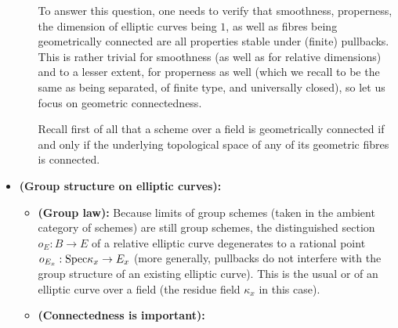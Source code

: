 \begin{remark}
\begin{itemize}
\begin{enumerate}
                                To answer this question, one needs to verify that smoothness, properness, the dimension of elliptic curves being $1$, as well as fibres being geometrically connected are all properties stable under (finite) pullbacks. This is rather trivial for smoothness (as well as for relative dimensions) and to a lesser extent, for properness as well (which we recall to be the same as being separated, of finite type, and universally closed), so let us focus on geometric connectedness.
                                
                                Recall first of all that a scheme over a field is geometrically connected if and only if the underlying topological space of any of its geometric fibres is connected.
                            \end{enumerate}
                        \item \textbf{(Group structure on elliptic curves):} 
                            \begin{itemize}
                                \item \textbf{(Group law):} Because limits of group schemes (taken in the ambient category of schemes) are still group schemes, the distinguished section $o_E: B \to E$ of a relative elliptic curve degenerates to a rational point $o_{E_x}: \mathrm{Spec} \kappa_x \to E_x$ (more generally, pullbacks do not interfere with the group structure of an existing elliptic curve). This is the usual  or  of an elliptic curve over a field (the residue field $\kappa_x$ in this case).
                                \item \textbf{(Connectedness is important):}
                            \end{itemize}
                    \end{itemize}
                \end{remark}
                

